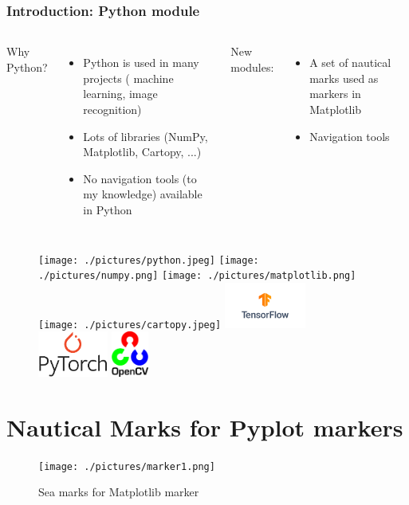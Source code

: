\documentclass{beamer}
\begin{document}
\begin{frame}
\frametitle{Introduction: Python module}
    
        \begin{columns}
        Why Python?
        \begin{itemize}
            \item Python is used in many projects ( machine learning, image recognition)
            \item Lots of libraries (NumPy, Matplotlib, Cartopy, ...)
            \item No navigation tools (to my knowledge) available in Python
        \end{itemize}
    
        New modules:
        \begin{itemize}
            \item A set of nautical marks used as markers in Matplotlib
            \item Navigation tools
        \end{itemize}
    \end{columns}

        \begin{figure}[h]
        \centering
        \texttt{[image: ./pictures/python.jpeg]}
        \texttt{[image: ./pictures/numpy.png]}
        \texttt{[image: ./pictures/matplotlib.png]}
        \texttt{[image: ./pictures/cartopy.jpeg]}
        \includegraphics[height=1.5cm]{./pictures/TensorFlow.png}
        \includegraphics[height=1.5cm]{./pictures/PyTorch.png}
        \includegraphics[height=1.5cm]{./pictures/OpenCV.png}
        \end{figure}


\end{frame}

\section{Nautical Marks for Pyplot markers }
\begin{frame}
    \begin{figure}[l]
    \centering
    \texttt{[image: ./pictures/marker1.png]}
    \caption{Sea marks for Matplotlib marker  }
    \end{figure}
\end{frame}
\end{document}

